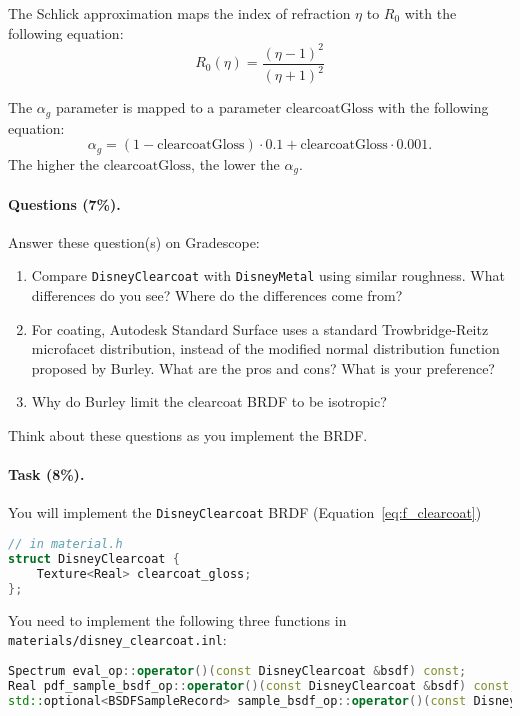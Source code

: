 The Schlick approximation maps the index of refraction $\eta$ to $R_0$ with the following equation:
\begin{equation}
R_0(\eta) = \frac{\left(\eta - 1\right)^2}{\left(\eta + 1\right)^2}
\end{equation}

The $\alpha_g$ parameter is mapped to a parameter $\text{clearcoatGloss}$ with the following equation:
\begin{equation}
\alpha_g = (1 - \text{clearcoatGloss}) \cdot 0.1 + \text{clearcoatGloss} \cdot 0.001.
\end{equation}
The higher the $\text{clearcoatGloss}$, the lower the $\alpha_g$.

\paragraph{Questions (7\%).} Answer these question(s) on Gradescope:
\begin{enumerate}
    \item Compare \lstinline{DisneyClearcoat} with \lstinline{DisneyMetal} using similar roughness. What differences do you see? Where do the differences come from?
    \item For coating, Autodesk Standard Surface uses a standard Trowbridge-Reitz microfacet distribution, instead of the modified normal distribution function proposed by Burley. What are the pros and cons? What is your preference? 
    \item Why do Burley limit the clearcoat BRDF to be isotropic?
\end{enumerate}
Think about these questions as you implement the BRDF.

\paragraph{Task (8\%).} You will implement the \lstinline{DisneyClearcoat} BRDF (Equation~\ref{eq:f_clearcoat})
\begin{lstlisting}[language=c++]
// in material.h
struct DisneyClearcoat {
    Texture<Real> clearcoat_gloss;
};
\end{lstlisting}

You need to implement the following three functions in \lstinline{materials/disney_clearcoat.inl}:
\begin{lstlisting}[language=c++]
Spectrum eval_op::operator()(const DisneyClearcoat &bsdf) const;
Real pdf_sample_bsdf_op::operator()(const DisneyClearcoat &bsdf) const;
std::optional<BSDFSampleRecord> sample_bsdf_op::operator()(const DisneyClearcoat &bsdf) const;
\end{lstlisting}

